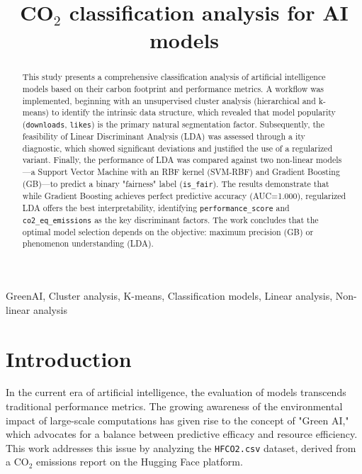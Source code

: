 \documentclass[journal]{IEEEtran}
\title{ CO$_{2}$ classification analysis for AI models}
\author{
	\IEEEauthorblockN{Juan Felipe Gallo Rendón\IEEEauthorrefmark{1}}
	\IEEEauthorblockA{\textit{Engineering department} \\
		\textit{University of Antioquia}\\
		Medellín, Colombia}
}
\begin{document}
	\maketitle

\begin{abstract}
	This study presents a comprehensive classification analysis of artificial intelligence models based on their carbon footprint and performance metrics. A workflow was implemented, beginning with an unsupervised cluster analysis (hierarchical and k-means) to identify the intrinsic data structure, which revealed that model popularity (\texttt{downloads}, \texttt{likes}) is the primary natural segmentation factor. Subsequently, the feasibility of Linear Discriminant Analysis (LDA) was assessed through a ity diagnostic, which showed significant deviations and justified the use of a regularized variant. Finally, the performance of LDA was compared against two non-linear models—a Support Vector Machine with an RBF kernel (SVM-RBF) and Gradient Boosting (GB)—to predict a binary "fairness" label (\texttt{is\_fair}). The results demonstrate that while Gradient Boosting achieves perfect predictive accuracy (AUC=1.000), regularized LDA offers the best interpretability, identifying \texttt{performance\_score} and \texttt{co2\_eq\_emissions} as the key discriminant factors. The work concludes that the optimal model selection depends on the objective: maximum precision (GB) or phenomenon understanding (LDA).
\end{abstract}

	\begin{IEEEkeywords}
		GreenAI, Cluster analysis, K-means, Classification models, Linear analysis, Non-linear analysis
	\end{IEEEkeywords}


\section{Introduction}

In the current era of artificial intelligence, the evaluation of models transcends traditional performance metrics. The growing awareness of the environmental impact of large-scale computations has given rise to the concept of "Green AI," which advocates for a balance between predictive efficacy and resource efficiency. This work addresses this issue by analyzing the \texttt{HFCO2.csv} dataset, derived from a CO$_{2}$ emissions report on the Hugging Face platform.
\end{document}
